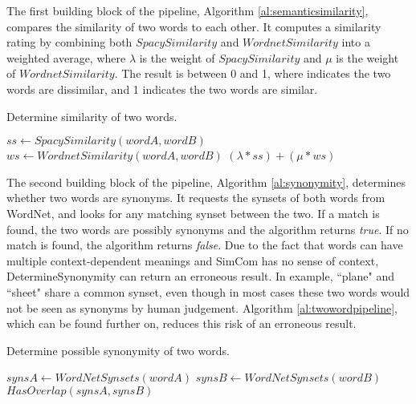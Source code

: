 \documentclass{article}
\begin{document}
The first building block of the pipeline, Algorithm \ref{al:semanticsimilarity}, compares the similarity of two words to each other. It computes a similarity rating by combining both $\textit{SpacySimilarity}$ and $\textit{WordnetSimilarity}$ into a weighted average, where $\lambda$ is the weight of $\textit{SpacySimilarity}$ and $\mu$ is the weight of $\textit{WordnetSimilarity}$. The result is between 0 and 1, where indicates the two words are dissimilar, and 1 indicates the two words are similar.

\begin{algorithm}
\caption{Determine similarity of two words.}\label{al:semanticsimilarity}
\begin{algorithmic}[1]
		\State $\textit{ss} \gets \textit{SpacySimilarity}(wordA, wordB)$
		\State $\textit{ws} \gets \textit{WordnetSimilarity}(wordA, wordB)$
		\State \Return $(\lambda*ss)+(\mu*ws)$
	\EndProcedure
\end{algorithmic}
\end{algorithm}

The second building block of the pipeline, Algorithm \ref{al:synonymity}, determines whether two words are synonyms. It requests the synsets of both words from WordNet, and looks for any matching synset between the two. If a match is found, the two words are possibly synonyms and the algorithm returns \textit{true}. If no match is found, the algorithm returns \textit{false}. Due to the fact that words can have multiple context-dependent meanings and SimCom has no sense of context, DetermineSynonymity can return an erroneous result. In example, ``plane" and ``sheet" share a common synset, even though in most cases these two words would not be seen as synonyms by human judgement. Algorithm \ref{al:twowordpipeline}, which can be found further on, reduces this risk of an erroneous result.

\begin{algorithm}
\caption{Determine possible synonymity of two words.}\label{al:synonymity}
\begin{algorithmic}[1]
		\State $\textit{synsA} \gets \textit{WordNetSynsets}(wordA)$
		\State $\textit{synsB} \gets \textit{WordNetSynsets}(wordB)$
		\State \Return $\textit{HasOverlap}(synsA, synsB)$
	\EndProcedure
\end{algorithmic}
\end{algorithm}
\end{document}
